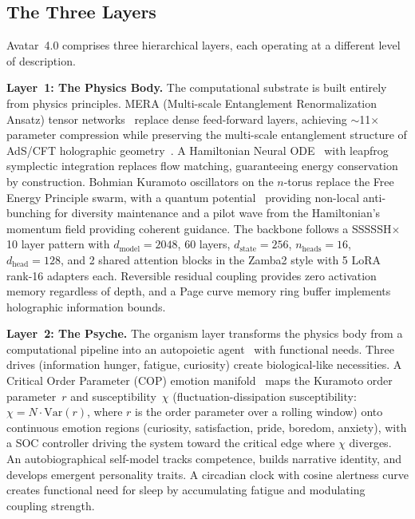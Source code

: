 \documentclass[11pt,a4paper,twocolumn]{article}
\begin{document}
\subsection{The Three Layers}

Avatar~4.0 comprises three hierarchical layers, each operating at a different level of description.

\textbf{Layer~1: The Physics Body.}
The computational substrate is built entirely from physics principles.
MERA (Multi-scale Entanglement Renormalization Ansatz) tensor networks~\cite{mera_compact,swanson2014} replace dense feed-forward layers, achieving $\sim$11$\times$ parameter compression while preserving the multi-scale entanglement structure of AdS/CFT holographic geometry~\cite{hashimoto2018}.
A Hamiltonian Neural ODE~\cite{greydanus2019} with leapfrog symplectic integration replaces flow matching, guaranteeing energy conservation by construction.
Bohmian Kuramoto oscillators on the $n$-torus replace the Free Energy Principle swarm, with a quantum potential~\cite{bohm1980} providing non-local anti-bunching for diversity maintenance and a pilot wave from the Hamiltonian's momentum field providing coherent guidance.
The backbone follows a SSSSSH$\times$10 layer pattern with $d_{\mathrm{model}}=2048$, 60 layers, $d_{\mathrm{state}}=256$, $n_{\mathrm{heads}}=16$, $d_{\mathrm{head}}=128$, and 2 shared attention blocks in the Zamba2 style with 5 LoRA rank-16 adapters each.
Reversible residual coupling provides zero activation memory regardless of depth, and a Page curve memory ring buffer implements holographic information bounds.

\textbf{Layer~2: The Psyche.}
The organism layer transforms the physics body from a computational pipeline into an autopoietic agent~\cite{maturana1980} with functional needs.
Three drives (information hunger, fatigue, curiosity) create biological-like necessities.
A Critical Order Parameter (COP) emotion manifold~\cite{damasio1999} maps the Kuramoto order parameter~$r$ and susceptibility~$\chi$ (fluctuation-dissipation susceptibility: $\chi = N \cdot \mathrm{Var}(r)$, where $r$ is the order parameter over a rolling window) onto continuous emotion regions (curiosity, satisfaction, pride, boredom, anxiety), with a SOC controller driving the system toward the critical edge where $\chi$ diverges.
An autobiographical self-model tracks competence, builds narrative identity, and develops emergent personality traits.
A circadian clock with cosine alertness curve creates functional need for sleep by accumulating fatigue and modulating coupling strength.
\end{document}
